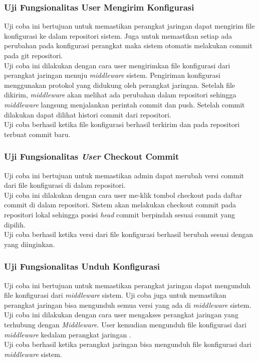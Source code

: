     	\subsubsection{Uji Fungsionalitas User Mengirim Konfigurasi}
    	Uji coba ini bertujuan untuk memastikan perangkat jaringan dapat mengirim file konfigurasi ke dalam repositori sistem. Juga untuk memastikan setiap ada perubahan pada konfigurasi perangkat maka sistem otomatis melakukan commit pada git repositori.\\
    	\indent Uji coba ini dilakukan dengan cara user mengirimkan file konfigurasi dari perangkat jaringan menuju \textit{middleware} sistem. Pengiriman konfigurasi menggunakan protokol yang didukung oleh perangkat jaringan. Setelah file dikirim, \textit{middleware} akan melihat ada perubahan dalam repositori sehingga \textit{middleware} langsung menjalankan perintah commit dan push. Setelah commit dilakukan dapat dilihat histori commit dari repositori.\\
    	\indent Uji coba berhasil ketika file konfigurasi berhasil terkirim dan pada repositori terbuat commit baru.
    	
    	\subsubsection{Uji Fungsionalitas \textit{User} Checkout Commit}
    	Uji coba ini bertujuan untuk memastikan admin dapat merubah versi commit dari file konfigurasi di dalam repositori.\\
    	\indent Uji coba ini dilakukan dengan cara user me-klik tombol checkout pada daftar commit di dalam repositori. Sistem akan melakukan checkout commit pada repositori lokal sehingga posisi \textit{head} commit berpindah sesuai commit yang dipilih.\\
    	\indent Uji coba berhasil ketika versi dari file konfigurasi berhasil berubah sesuai dengan yang diinginkan.
    	
    	\subsubsection{Uji Fungsionalitas Unduh Konfigurasi}
    	Uji coba ini bertujuan untuk memastikan perangkat jaringan dapat mengunduh file konfigurasi dari \textit{middleware} sistem. Uji coba juga untuk memastikan perangkat jaringan bisa mengunduh semua versi yang ada di \textit{middleware} sistem. \\
    	\indent Uji coba ini dilakukan dengan cara user mengakses perangkat jaringan yang terhubung dengan \textit{Middleware}. User kemudian mengunduh file konfigurasi dari \textit{middleware} kedalam perangkat jaringan . \\
    	\indent Uji coba berhasil ketika perangkat jaringan bisa mengunduh file konfigurasi dari \textit{middleware} sistem.
    	
